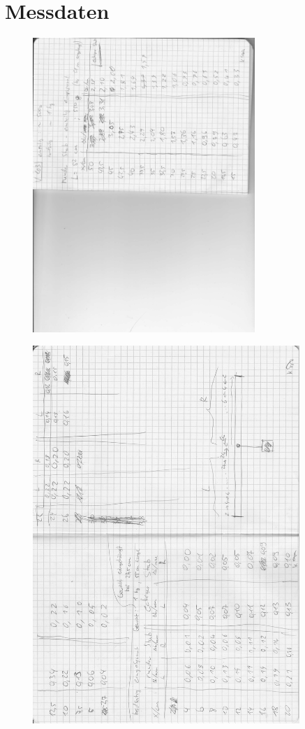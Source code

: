 \appendix

\clearpage
\section{Messdaten}

\begin{figure}
    \centering
    \includegraphics[width=0.75\textwidth]{assets/messdaten1.pdf}
\end{figure}
\begin{figure}
    \centering
    \includegraphics[width=0.9\textwidth]{assets/messdaten2.pdf}
\end{figure}
